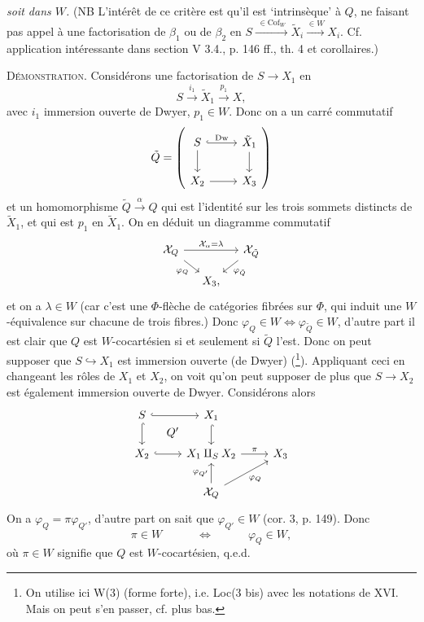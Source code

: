 \documentclass[11pt]{article}
\newcommand{\printedpage}[1]{\marginpar{\footnotesize p.~#1}}
\newcommand{\msp}[1]{\marginpar{\footnotesize [#1]}}
\newcommand{\Cof}{\mathrm{Cof}}
\begin{document}
\printedpage{171}
\textit{soit dans $W$.} (NB L'intérêt de ce critère est qu'il est `intrinsèque' à $Q$, ne faisant pas appel à une factorisation de $\beta_1$ ou de $\beta_2$ en $S \xrightarrow{\;\in \Cof_W\;} \tilde{X}_i \xrightarrow{\in W} X_i$. Cf. application intéressante dans section V 3.4., p. 146 ff., th. 4 et corollaires.)

\msp{page 263}
\textsc{Démonstration.} Considérons une factorisation de $S \longrightarrow X_1$ en
\[
S \xrightarrow{i_1} \tilde{X}_1 \xrightarrow{p_1} X, %
\]
avec $i_1$ immersion ouverte de Dwyer, $p_1 \in W$. Donc on a un carré commutatif
\[
\tilde{Q} = \left(
\begin{tikzcd}[ampersand replacement=\&]
S \arrow[r, hook, "\mathrm{Dw}"] \arrow[d] \& \tilde{X}_1 \arrow[d] \\
X_2 \arrow[r] \& X_3
\end{tikzcd}
\right)
\]
et un homomorphisme $\tilde{Q} \xrightarrow{\alpha} Q$ qui est l'identité sur les trois sommets distincts de $\tilde{X}_1$, et qui est $p_1$ en $\tilde{X}_1$. On en déduit un diagramme commutatif
\[
\begin{tikzcd}[ampersand replacement=\&, row sep=small, column sep=small]
\mathcal{X}_Q \arrow[rr, "\mathcal{X}_\alpha = \lambda"] \arrow[dr, "\varphi_Q"'] \& \& \mathcal{X}_{\tilde{Q}} \arrow[dl, "\varphi_{\tilde{Q}}"] \\
 \& X_3, \&
\end{tikzcd}
\]
et on a $\lambda \in W$ (car c'est une $\Phi$-flèche de catégories fibrées sur $\Phi$, qui induit une $W$-équivalence sur chacune de trois fibres.) Donc $\varphi_Q \in W \iff \varphi_{\tilde{Q}} \in W$, d'autre part il est clair que $Q$ est $W$-cocartésien si et seulement si $\tilde{Q}$ l'est. Donc on peut supposer que $S \hookrightarrow X_1$ est immersion ouverte (de Dwyer) (\footnote[134]{On utilise ici W(3) (forme forte), i.e. Loc(3 bis) avec les notations de XVI. Mais on peut s'en passer, cf. plus bas.}). Appliquant ceci
\msp{page 264}
en changeant les rôles de $X_1$ et $X_2$, on voit qu'on peut supposer de plus que $S \longrightarrow X_2$ est également immersion ouverte de Dwyer. Considérons alors
\[
\begin{tikzcd}[ampersand replacement=\&]
S \arrow[r, hook] \arrow[d, hook] \arrow[dr, phantom, "Q'"] \& X_1 \arrow[d, hook] \& \\
X_2 \arrow[r, hook] \& X_1 \amalg_S X_2 \arrow[r, "\pi"] \& X_3 \\
 \& \mathcal{X}_Q \arrow[u, "\varphi_{Q'}"] \arrow[ur, "\varphi_Q"'] \&
\end{tikzcd}
\]
\printedpage{172}
On a $\varphi_Q = \pi\varphi_{Q'}$, d'autre part on sait que $\varphi_{Q'} \in W$ (cor. 3, p. 149). Donc
\[
\pi \in W \qquad\quad \iff \qquad\quad \varphi_Q \in W,
\]
où $\pi \in W$ signifie que $Q$ est $W$-cocartésien, q.e.d.
\end{document}

